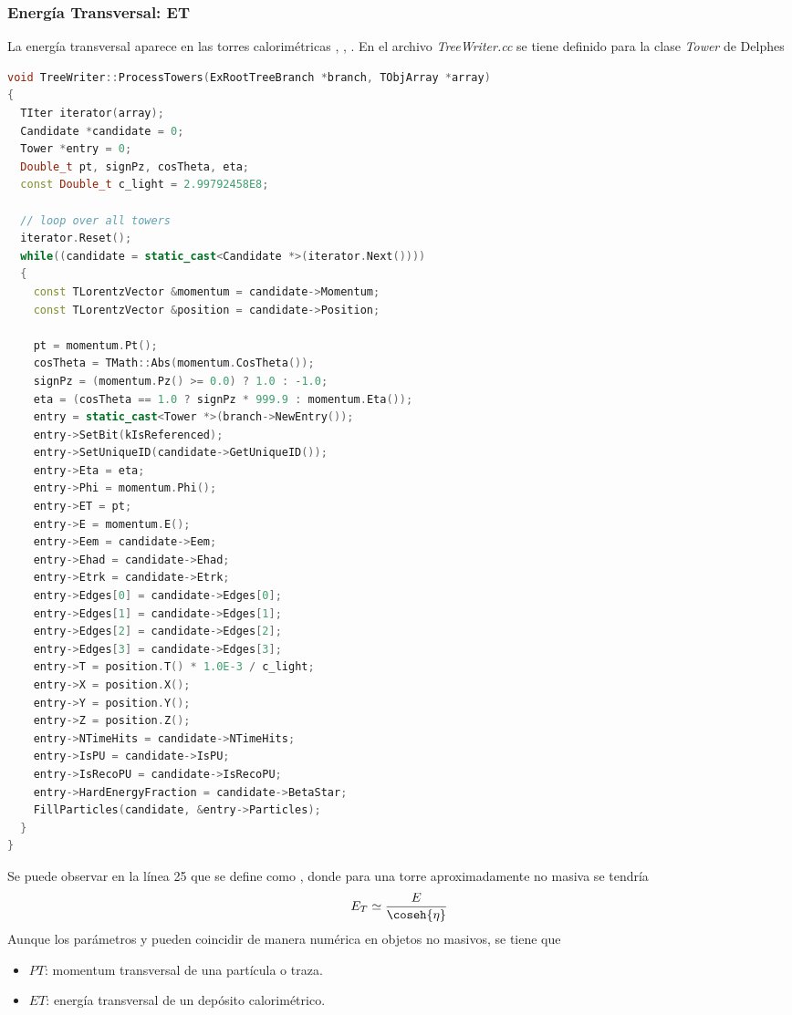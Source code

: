         \subsubsection{Energía Transversal: ET}
        La energía transversal  aparece en las torres calorimétricas , , . En el archivo \textit{TreeWriter.cc} se tiene definido para la clase \textit{Tower} de Delphes
\begin{lstlisting}[language=c++]
void TreeWriter::ProcessTowers(ExRootTreeBranch *branch, TObjArray *array)
{
  TIter iterator(array);
  Candidate *candidate = 0;
  Tower *entry = 0;
  Double_t pt, signPz, cosTheta, eta;
  const Double_t c_light = 2.99792458E8;

  // loop over all towers
  iterator.Reset();
  while((candidate = static_cast<Candidate *>(iterator.Next())))
  {
    const TLorentzVector &momentum = candidate->Momentum;
    const TLorentzVector &position = candidate->Position;

    pt = momentum.Pt();
    cosTheta = TMath::Abs(momentum.CosTheta());
    signPz = (momentum.Pz() >= 0.0) ? 1.0 : -1.0;
    eta = (cosTheta == 1.0 ? signPz * 999.9 : momentum.Eta());
    entry = static_cast<Tower *>(branch->NewEntry());
    entry->SetBit(kIsReferenced);
    entry->SetUniqueID(candidate->GetUniqueID());
    entry->Eta = eta;
    entry->Phi = momentum.Phi();
    entry->ET = pt;
    entry->E = momentum.E();
    entry->Eem = candidate->Eem;
    entry->Ehad = candidate->Ehad;
    entry->Etrk = candidate->Etrk;
    entry->Edges[0] = candidate->Edges[0];
    entry->Edges[1] = candidate->Edges[1];
    entry->Edges[2] = candidate->Edges[2];
    entry->Edges[3] = candidate->Edges[3];
    entry->T = position.T() * 1.0E-3 / c_light;
    entry->X = position.X();
    entry->Y = position.Y();
    entry->Z = position.Z();
    entry->NTimeHits = candidate->NTimeHits;
    entry->IsPU = candidate->IsPU;
    entry->IsRecoPU = candidate->IsRecoPU;
    entry->HardEnergyFraction = candidate->BetaStar;
    FillParticles(candidate, &entry->Particles);
  }
}
\end{lstlisting}
        Se puede observar en la línea 25 que  se define como , donde para una torre aproximadamente no masiva se tendría
        \begin{equation*}
            \begin{aligned}
                E_{T} \simeq \frac{E}{\coseh{\eta}}
            \end{aligned}
        \end{equation*}
        Aunque los parámetros  y  pueden coincidir de manera numérica en objetos no masivos, se tiene que
        \begin{itemize}
            \item $PT$: momentum transversal de una partícula o traza.
            \item $ET$: energía transversal de un depósito calorimétrico.
        \end{itemize}

